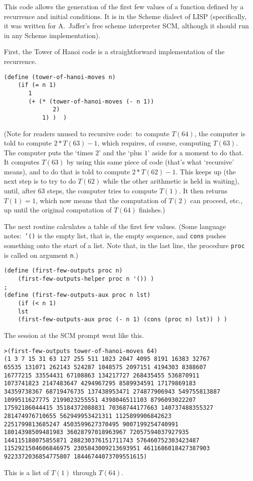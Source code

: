 \announcecomputercode
This code allows the generation of the first few values of a function 
defined by a recurrence and initial conditions.
It is in the Scheme dialect of LISP
(specifically, it was written for A.~Jaffer's free scheme interpreter SCM, 
although it should run in any Scheme implementation).

First,
the Tower of Hanoi code is a straightforward implementation of the recurrence.
\begin{lstlisting}
(define (tower-of-hanoi-moves n) 
    (if (= n 1)
       1
       (+ (* (tower-of-hanoi-moves (- n 1)) 
              2) 
           1) )  )
\end{lstlisting}
\noindent (Note for readers unused to recursive code:~to compute $T(64)$, 
the computer is told to compute $2*T(63)-1$, which requires, of course,
computing $T(63)$.
The computer puts the `times $2$' and the `plus $1$' aside for a moment
to do that.
It computes  $T(63)$ by using this same piece of code (that's 
what `recursive' means), and to do that is told to compute $2*T(62)-1$.
This keeps up (the next step is to try to do $T(62)$ while the other 
arithmetic is held in waiting), until, after $63$ steps, the computer
tries to compute $T(1)$.
It then returns $T(1)=1$, 
which now means that the computation of $T(2)$ can proceed,
etc., up until the original computation of $T(64)$ finishes.)

The next routine calculates a table of the first few 
values.
(Some language notes:~\texttt{'()} is the empty list, that is, 
the empty sequence, and \texttt{cons} pushes something onto the start of a 
list.
Note that, in the last line, the procedure \texttt{proc}
is called on argument \texttt{n}.)
\begin{lstlisting}
(define (first-few-outputs proc n)
    (first-few-outputs-helper proc n '()) )
;
(define (first-few-outputs-aux proc n lst)
    (if (< n 1)
    lst 
    (first-few-outputs-aux proc (- n 1) (cons (proc n) lst)) ) )
\end{lstlisting}
\noindent The session at the SCM prompt went like this.
\begin{lstlisting}
>(first-few-outputs tower-of-hanoi-moves 64)
(1 3 7 15 31 63 127 255 511 1023 2047 4095 8191 16383 32767 
65535 131071 262143 524287 1048575 2097151 4194303 8388607 
16777215 33554431 67108863 134217727 268435455 536870911 
1073741823 2147483647 4294967295 8589934591 17179869183 
34359738367 68719476735 137438953471 274877906943 549755813887 
1099511627775 2199023255551 4398046511103 8796093022207 
17592186044415 35184372088831 70368744177663 140737488355327 
281474976710655 562949953421311 1125899906842623 
2251799813685247 4503599627370495 9007199254740991 
18014398509481983 36028797018963967 72057594037927935 
144115188075855871 288230376151711743 576460752303423487 
1152921504606846975 2305843009213693951 4611686018427387903 
9223372036854775807 18446744073709551615)
\end{lstlisting}
\noindent This is a list of $T(1)$ through $T(64)$.
\endinput


